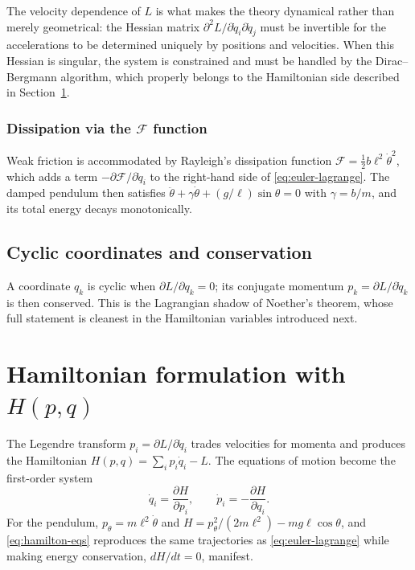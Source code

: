 \documentclass[11pt]{article}
\begin{document}
The velocity dependence of $L$ is what makes the theory dynamical rather than
merely geometrical: the Hessian matrix $\partial^2 L / \partial \dot{q}_i
\partial \dot{q}_j$ must be invertible for the accelerations to be determined
uniquely by positions and velocities. When this Hessian is singular, the
system is constrained and must be handled by the Dirac--Bergmann algorithm,
which properly belongs to the Hamiltonian side described in
Section~\ref{sec:hamilton}.

\subsubsection{Dissipation via the \texorpdfstring{$\mathcal{F}$}{F} function}
\label{sec:dissipation}

Weak friction is accommodated by Rayleigh's dissipation function
$\mathcal{F} = \tfrac12 b \ell^{2} \dot{\theta}^{2}$, which adds a term
$-\partial \mathcal{F} / \partial \dot{q}_i$ to the right-hand side of
\eqref{eq:euler-lagrange}. The damped pendulum then satisfies
$\ddot{\theta} + \gamma \dot{\theta} + (g/\ell)\sin\theta = 0$ with
$\gamma = b/m$, and its total energy decays monotonically.

\subsection{Cyclic coordinates and conservation}
\label{sec:cyclic}

A coordinate $q_k$ is cyclic when $\partial L / \partial q_k = 0$; its
conjugate momentum $p_k = \partial L / \partial \dot{q}_k$ is then conserved.
This is the Lagrangian shadow of Noether's theorem, whose full statement is
cleanest in the Hamiltonian variables introduced next.

\section{Hamiltonian formulation with \texorpdfstring{$H(p, q)$}{H(p,q)}}
\label{sec:hamilton}

The Legendre transform $p_i = \partial L / \partial \dot{q}_i$ trades
velocities for momenta and produces the Hamiltonian $H(p, q) = \sum_i p_i
\dot{q}_i - L$. The equations of motion become the first-order system
\begin{equation}
  \label{eq:hamilton-eqs}
  \dot{q}_i = \frac{\partial H}{\partial p_i}, \qquad
  \dot{p}_i = -\frac{\partial H}{\partial q_i}.
\end{equation}
For the pendulum, $p_\theta = m\ell^2\dot\theta$ and
$H = p_\theta^2/(2m\ell^2) - mg\ell\cos\theta$, and \eqref{eq:hamilton-eqs}
reproduces the same trajectories as \eqref{eq:euler-lagrange} while making
energy conservation, $dH/dt = 0$, manifest.
\end{document}
